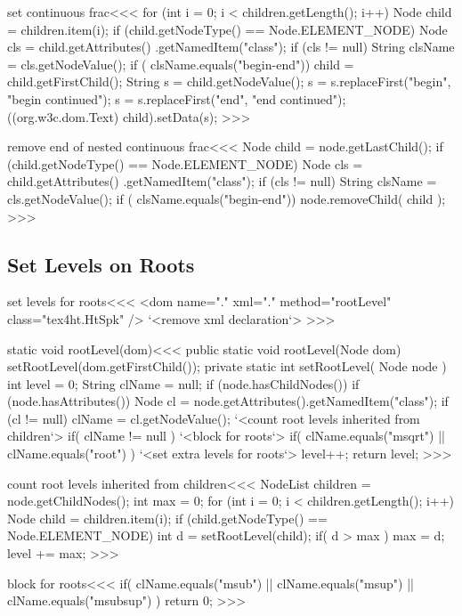 \documentclass{article}
\begin{document}
\<set continuous frac\><<<
for (int i = 0; i < children.getLength(); i++) {
  Node child = children.item(i);
  if (child.getNodeType() == Node.ELEMENT_NODE) {
    Node cls = child.getAttributes()
                   .getNamedItem("class");
    if (cls != null) {
       String clsName = cls.getNodeValue();
       if ( clsName.equals("begin-end")) {
          child = child.getFirstChild();
          String s = child.getNodeValue();
          s = s.replaceFirst("begin", "begin continued");
          s = s.replaceFirst("end", "end continued");
          ((org.w3c.dom.Text) child).setData(s);
} } } }
>>>

\<remove end of nested continuous frac\><<<
Node child = node.getLastChild();
if (child.getNodeType() == Node.ELEMENT_NODE) {
   Node cls = child.getAttributes() .getNamedItem("class");
   if (cls != null) {
      String clsName = cls.getNodeValue();
      if ( clsName.equals("begin-end")) {
         node.removeChild( child  );
}  }  }
>>>




\subsection{Set Levels on Roots}

\<set levels for roots\><<<
<dom name="." xml="." method="rootLevel" class="tex4ht.HtSpk" />
`<remove xml declaration`>
>>>

\<static void rootLevel(dom)\><<<
public static void rootLevel(Node dom) {
   setRootLevel(dom.getFirstChild());
}
private static int setRootLevel( Node node ){
  int level = 0;
  String clName = null;
  if (node.hasChildNodes()) {
    if (node.hasAttributes()) {
      Node cl = node.getAttributes().getNamedItem("class");
      if (cl != null) { clName = cl.getNodeValue(); }
    }
    `<count root levels inherited from children`>
    if( clName != null ){
      `<block for roots`>
      if( clName.equals("msqrt") || clName.equals("root") ){
        `<set extra levels for roots`>
        level++;
  } } }
  return level;
}
>>>


\<count root levels inherited from children\><<<
NodeList children = node.getChildNodes();
int max = 0;
for (int i = 0; i < children.getLength(); i++) {
  Node child = children.item(i);
  if (child.getNodeType() == Node.ELEMENT_NODE) {
    int d = setRootLevel(child);
    if( d > max ){ max = d; }
} }
level += max;
>>>


\<block for roots\><<<
if( clName.equals("msub") || clName.equals("msup") ||
    clName.equals("msubsup") 
) {
   return 0;
}
>>>
\end{document}
